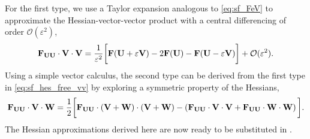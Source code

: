 For the first type, we use a Taylor expansion analogous to \cref{eq:sf_FeV}
to approximate the Hessian-vector-vector product with
a central differencing of order \( \mathcal{O}(\varepsilon^{2}) \),
\begin{equation}\label{eq:sf_hes_free_vv}
    \mathbf{F}_{\mathbf{U} \mathbf{U}} \cdot \mathbf{V} \cdot \mathbf{V} = \frac{1}{\varepsilon^{2}}
    \bigg[ \mathbf{F}(\mathbf{U} + \varepsilon \mathbf{V}) -2\mathbf{F}(\mathbf{U}) -\mathbf{F}(\mathbf{U} - \varepsilon \mathbf{V}) \bigg]
    + \mathcal{O} ( \varepsilon^{2} ).
\end{equation}
Using a simple vector calculus,
the second type can be derived from the first type in \cref{eq:sf_hes_free_vv}
by exploring a symmetric property of the Hessians,
\begin{equation}\label{eq:sf_hes_free_vw}
        \mathbf{F}_{\mathbf{U} \mathbf{U}} \cdot \mathbf{V} \cdot \mathbf{W} = \frac{1}{2}
    \bigg[ \mathbf{F}_{\mathbf{U} \mathbf{U}} \cdot \left( \mathbf{V} + \mathbf{W} \right) \cdot \left( \mathbf{V} + \mathbf{W} \right) -
          \left( \mathbf{F}_{\mathbf{U} \mathbf{U}} \cdot \mathbf{V} \cdot \mathbf{V} + \mathbf{F}_{\mathbf{U} \mathbf{U}} \cdot \mathbf{W} \cdot \mathbf{W} \right) \bigg].
\end{equation}
The Hessian approximations derived here are now ready to be substituted
in .

